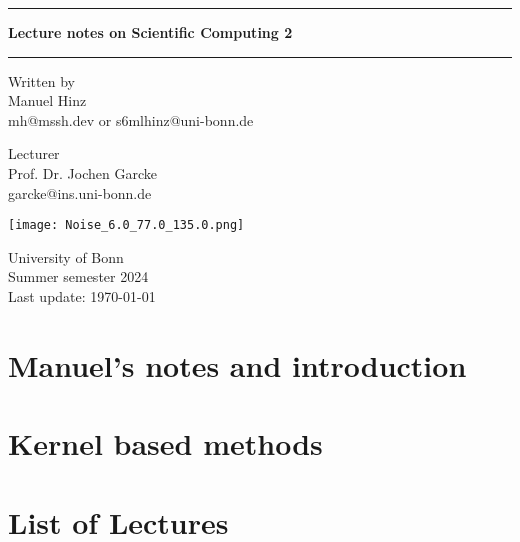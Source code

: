\documentclass[a4paper, 10pt, oneside]{book}
\author{Manuel Hinz}
\begin{document}
\pagecolor{mycolor}
\begin{titlepage}
    \centering

    \vspace*{1cm}

    \rule{\textwidth}{1pt}

    \vspace{.7\baselineskip}
    {\huge \textbf{Lecture notes on Scientific Computing 2}}

    \rule{\textwidth}{1pt}

    \vspace{1.5cm}

    \large

    \begin{minipage}{.5\textwidth}
        \centering
        Written by \\
        Manuel Hinz\\
        {\normalsize mh@mssh.dev or s6mlhinz@uni-bonn.de}
    \end{minipage}%
    \begin{minipage}{.5\textwidth}
        \centering
        Lecturer\\
        Prof. Dr. Jochen Garcke  \\
        {\normalsize garcke@ins.uni-bonn.de}
    \end{minipage}


    \vspace{3cm}

    \texttt{[image: Noise\_6.0\_77.0\_135.0.png]}

    \vfill

    University of Bonn \\
    Summer semester 2024\\
    Last update: \today
   
\end{titlepage}
\pagecolor{white}
\tableofcontents
\restoregeometry
\setcounter{chapter}{-1}
\chapter{Manuel's notes and introduction}



\chapter{Kernel based methods}


\chapter*{List of Lectures}
\begin{itemize}
    \renewcommand*{\do}[1]{\item \hyperlink{#1}{Lecture \StrBehind{#1}{c}}}
    \dolistloop{\lecturelist}
\end{itemize}
\end{document}
